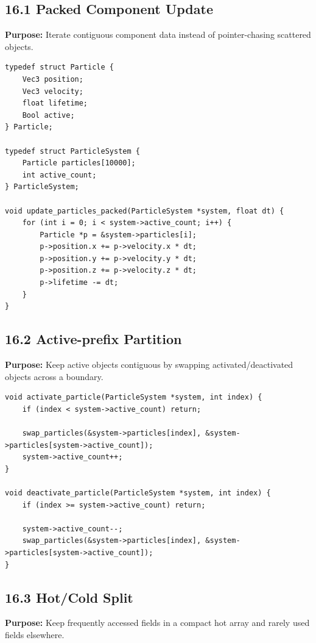 \documentclass[10pt,letterpaper]{article}
\begin{document}
\subsection{16.1 Packed Component Update}

\textbf{Purpose:} Iterate contiguous component data instead of pointer-chasing scattered objects.

\begin{verbatim}
typedef struct Particle {
    Vec3 position;
    Vec3 velocity;
    float lifetime;
    Bool active;
} Particle;

typedef struct ParticleSystem {
    Particle particles[10000];
    int active_count;
} ParticleSystem;

void update_particles_packed(ParticleSystem *system, float dt) {
    for (int i = 0; i < system->active_count; i++) {
        Particle *p = &system->particles[i];
        p->position.x += p->velocity.x * dt;
        p->position.y += p->velocity.y * dt;
        p->position.z += p->velocity.z * dt;
        p->lifetime -= dt;
    }
}
\end{verbatim}

\subsection{16.2 Active-prefix Partition}

\textbf{Purpose:} Keep active objects contiguous by swapping activated/deactivated objects across a boundary.

\begin{verbatim}
void activate_particle(ParticleSystem *system, int index) {
    if (index < system->active_count) return;

    swap_particles(&system->particles[index], &system->particles[system->active_count]);
    system->active_count++;
}

void deactivate_particle(ParticleSystem *system, int index) {
    if (index >= system->active_count) return;

    system->active_count--;
    swap_particles(&system->particles[index], &system->particles[system->active_count]);
}
\end{verbatim}

\subsection{16.3 Hot/Cold Split}

\textbf{Purpose:} Keep frequently accessed fields in a compact hot array and rarely used fields elsewhere.
\end{document}
